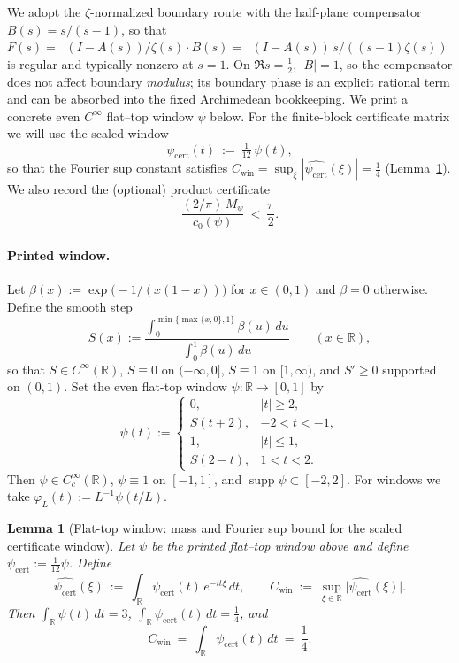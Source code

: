 \documentclass[11pt]{article}
\newtheorem{lemma}[theorem]{Lemma}
\theoremstyle{definition}
\theoremstyle{remark}
\theoremstyle{definition}
\newcommand{\R}{\mathbb{R}}
\DeclareMathOperator{\dettwo}{det_2}
\begin{document}
We adopt the \(\zeta\)-normalized boundary route with the half-plane compensator \(B(s)=s/(s-1)\), so that
\(
F(s)=\dettwo(I-A(s))/\zeta(s)\cdot B(s)=\dettwo(I-A(s))\,s/((s-1)\zeta(s))
\)
is regular and typically nonzero at \(s=1\).
On \(\Re s=\tfrac12\), \(|B|=1\), so the compensator does not affect boundary \emph{modulus}; its boundary phase is an explicit rational term and can be absorbed into the fixed Archimedean bookkeeping.
We print a concrete even $C^\infty$ flat--top window \(\psi\) below. For the finite-block certificate matrix we will use the scaled window
\[
  \psi_{\mathrm{cert}}(t)\ :=\ \tfrac1{12}\,\psi(t),
\]
so that the Fourier sup constant satisfies \(C_{\mathrm{win}}=\sup_{\xi}|\widehat{\psi_{\mathrm{cert}}}(\xi)|=\tfrac14\) (Lemma~\ref{lem:psi-cert-Cwin}). We also record the (optional) product certificate
\[
  \frac{(2/\pi)\,M_\psi}{c_0(\psi)}\ <\ \frac{\pi}{2}.
\]
\paragraph{Printed window.}
Let \(\beta(x):=\exp\!\big(-1/(x(1-x))\big)\) for \(x\in(0,1)\) and \(\beta=0\) otherwise. Define the smooth step
\[
  S(x):=\frac{\int_0^{\min\{\max\{x,0\},1\}} \beta(u)\,du}{\int_0^{1} \beta(u)\,du}\qquad (x\in\R),
\]
so that \(S\in C^\infty(\R)\), \(S\equiv 0\) on \(({-}\infty,0]\), \(S\equiv1\) on \([1,\infty)\), and \(S'\ge 0\) supported on \((0,1)\). Set the even flat-top window \(\psi:\R\to[0,1]\) by
\[
  \psi(t):=\begin{cases}
    0,& |t|\ge 2,\\
    S(t+2),& -2<t<-1,\\
    1,& |t|\le 1,\\
    S(2-t),& 1<t<2.
  \end{cases}
\]
Then \(\psi\in C_c^\infty(\R)\), \(\psi\equiv 1\) on \([-1,1]\), and \(\operatorname{supp}\psi\subset[-2,2]\). For windows we take \(\varphi_L(t):=L^{-1}\psi(t/L)\).

\begin{lemma}[Flat-top window: mass and Fourier sup bound for the scaled certificate window]\label{lem:psi-cert-Cwin}
Let $\psi$ be the printed flat--top window above and define $\psi_{\mathrm{cert}}:=\tfrac1{12}\psi$.
Define
\[
  \widehat{\psi_{\mathrm{cert}}}(\xi)\ :=\ \int_{\R}\psi_{\mathrm{cert}}(t)\,e^{-it\xi}\,dt,
  \qquad
  C_{\mathrm{win}}\ :=\ \sup_{\xi\in\R}\big|\widehat{\psi_{\mathrm{cert}}}(\xi)\big|.
\]
Then $\int_{\R}\psi(t)\,dt=3$, $\int_{\R}\psi_{\mathrm{cert}}(t)\,dt=\tfrac14$, and
\[
  C_{\mathrm{win}}\ =\ \int_{\R}\psi_{\mathrm{cert}}(t)\,dt\ =\ \frac14.
\]
\end{lemma}
\end{document}
